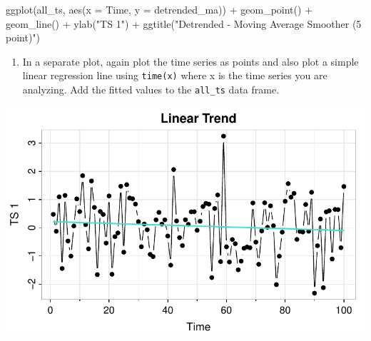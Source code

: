 \documentclass[
  letterpaper,
  DIV=11,
  numbers=noendperiod]{scrartcl}
\newenvironment{Shaded}{\begin{snugshade}}{\end{snugshade}}
\newcommand{\AttributeTok}[1]{\textcolor[rgb]{0.40,0.45,0.13}{#1}}
\newcommand{\DecValTok}[1]{\textcolor[rgb]{0.68,0.00,0.00}{#1}}
\newcommand{\FunctionTok}[1]{\textcolor[rgb]{0.28,0.35,0.67}{#1}}
\newcommand{\NormalTok}[1]{\textcolor[rgb]{0.00,0.23,0.31}{#1}}
\newcommand{\OtherTok}[1]{\textcolor[rgb]{0.00,0.23,0.31}{#1}}
\newcommand{\SpecialCharTok}[1]{\textcolor[rgb]{0.37,0.37,0.37}{#1}}
\newcommand{\StringTok}[1]{\textcolor[rgb]{0.13,0.47,0.30}{#1}}
\providecommand{\tightlist}{%
  \setlength{\itemsep}{0pt}\setlength{\parskip}{0pt}}\usepackage{longtable,booktabs,array}
\begin{document}
\begin{Shaded}
\begin{Highlighting}[]
\FunctionTok{ggplot}\NormalTok{(all\_ts, }\FunctionTok{aes}\NormalTok{(}\AttributeTok{x =}\NormalTok{ Time, }\AttributeTok{y =}\NormalTok{ detrended\_ma)) }\SpecialCharTok{+} \FunctionTok{geom\_point}\NormalTok{() }\SpecialCharTok{+} \FunctionTok{geom\_line}\NormalTok{() }\SpecialCharTok{+} 
  \FunctionTok{ylab}\NormalTok{(}\StringTok{"TS 1"}\NormalTok{) }\SpecialCharTok{+} \FunctionTok{ggtitle}\NormalTok{(}\StringTok{"Detrended {-} Moving Average Smoother (5 point)"}\NormalTok{)}
\end{Highlighting}
\end{Shaded}

\begin{enumerate}
\def\labelenumi{\arabic{enumi}.}
\setcounter{enumi}{4}
\tightlist
\item
  In a separate plot, again plot the time series as points and also plot
  a simple linear regression line using \texttt{time(x)} where x is the
  time series you are analyzing. Add the fitted values to the
  \texttt{all\_ts} data frame.
\end{enumerate}

\begin{Shaded}
\end{Shaded}

\includegraphics{Lecture7_files/figure-pdf/astsa_act2_part5-1.pdf}
\end{document}

